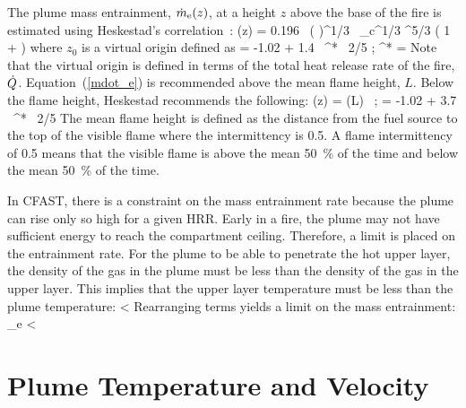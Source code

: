 The plume mass entrainment, $\dot{m}_{\rm e}(z)$, at a height $z$ above the base of the fire is estimated using Heskestad's correlation~\cite{Heskestad:2002}:
\be
   \dme(z) = 0.196 \, \left(  \right)^{1/3} \, \dQ_{\rm c}^{1/3} \; ^{5/3} \;
   \left( 1 +  \right) \label{mdot_e}
\ee
where $z_0$ is a virtual origin defined as
\be
    = -1.02 + 1.4 \, \dQ^{* \, 2/5} \quad ; \quad \dQ^* =  \label{virtual_origin}
\ee
Note that the virtual origin is defined in terms of the total heat release rate of the fire, $\dot{Q}$. Equation~(\ref{mdot_e}) is recommended above the mean flame height, $L$. Below the flame height, Heskestad recommends the following:
\be
  \dme(z) = \dme(L) \,  \quad ; \quad {} = -1.02 + 3.7 \, \dQ^{* \, 2/5}
\ee
The mean flame height is defined as the distance from the fuel source to the top of the visible flame where the intermittency is 0.5.  A flame intermittency of 0.5 means that the visible flame is above the mean 50~\% of the time and below the mean 50~\% of the time.

In CFAST, there is a constraint on the mass entrainment rate because the plume can rise only so high for a given HRR.  Early in a fire, the plume may not have sufficient energy to reach the compartment ceiling. Therefore, a limit is placed on the entrainment rate. For the plume to be able to penetrate the hot upper layer, the density of the gas in the plume must be less than the density of the gas in the upper layer. This implies that the upper layer temperature must be less than the plume temperature:
\be
   \Tu < \Tp \approx {}
\ee
Rearranging terms yields a limit on the mass entrainment:
\be
   \dm_e < 
\ee


\section{Plume Temperature and Velocity}
\label{sec:Plume_Temp_Velocity}

